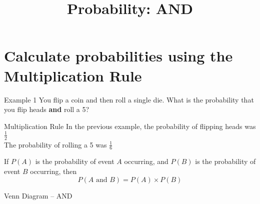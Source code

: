 \documentclass[t]{beamer}
\title{Probability: AND}
\author{}
\date{}
\begin{document}
\begin{frame} 
\maketitle
\end{frame}

\section{Calculate probabilities using the Multiplication Rule}

\begin{frame}{Example 1}
You flip a coin and then roll a single die. What is the probability that you flip heads {\color{blue}\textbf{and}} roll a 5?	\newline\\	
\end{frame}

\begin{frame}{Multiplication Rule}
In the previous example, the probability of flipping heads was $\frac{1}{2}$	\newline\\	\pause
The probability of rolling a 5 was $\frac{1}{6}$	\newline\\	\pause
\begin{tcolorbox}[colframe=green!20!black, colback = green!30!white,title=\textbf{Multiplication Rule}]
If $P(A)$ is the probability of event $A$ occurring, and $P(B)$ is the probability of event $B$ occurring, then
\[P(A\text{ and } B) = P(A) \times P(B)\]
\end{tcolorbox}
\end{frame}

\begin{frame}{Venn Diagram -- AND}
\begin{center}
\end{center}
\end{frame}
\end{document}
